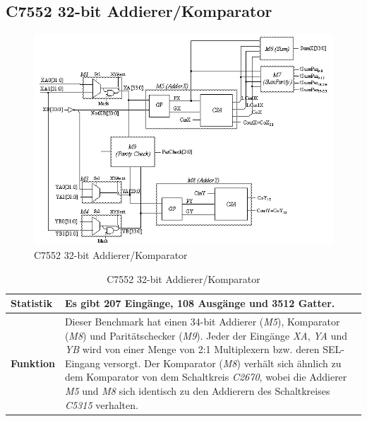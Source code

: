 \subsection*{C7552 32-bit Addierer/Komparator}
\label{sec:c7552}
\begin{figure}[bth]
	\centering
	\includegraphics[scale=0.6]{./img/c7552}
	\caption[C7552 32-bit Addierer/Komparator]{C7552 32-bit Addierer/Komparator \cite{h1999}}
	\label{fig:c7552}
\end{figure}
\begin{table}[bth]
	\centering
	\caption{C7552 32-bit Addierer/Komparator}
	\label{tab:c7552}
	\begin{tabular}{ | p{2cm} | p{12cm} |}
		\hline
		\textbf{Statistik} & Es gibt 207 Eingänge, 108 Ausgänge und 3512 Gatter. \\\hline
		\textbf{Funktion} & Dieser Benchmark hat einen 34-bit Addierer (\emph{M5}), Komparator (\emph{M8}) und Paritätschecker (\emph{M9}). Jeder der Eingänge \emph{XA}, \emph{YA} und \emph{YB} wird von einer Menge von 2:1 Multiplexern bzw. deren SEL-Eingang versorgt. Der Komparator (\emph{M8}) verhält sich ähnlich zu dem Komparator von dem Schaltkreis \emph{C2670}, wobei die Addierer \emph{M5} und \emph{M8} sich identisch zu den Addierern des Schaltkreises \emph{C5315} verhalten.\\\hline
	\end{tabular}
\end{table}
